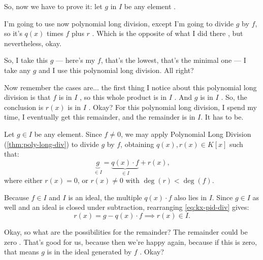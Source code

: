 \begin{proofWrapper}
\begin{speech}[00:34:07 - 00:35:15]
So, now we have to prove it: let $g$ in $I$ be any element .

I'm going to use now polynomial long division, except I'm going to divide $g$ by $f$, so it's $q(x)$ times $f$ plus $r$ . Which is the opposite of what I did there , but nevertheless, okay.

So, I take this $g$ --- here's my $f$, that's the lowest, that's the minimal one --- I take any $g$ and I use this polynomial long division. All right?

Now remember the cases are... the first thing I notice about this polynomial long division is that $f$ is in $I$ , so this whole product is in $I$ . And $g$ is in $I$ . So, the conclusion is $r(x)$ is in $I$ . Okay? For this polynomial long division, I spend my time, I eventually get this remainder, and the remainder is in $I$. It has to be.
\end{speech}

\begin{content}
Let $g \in I$ be any element. Since $f \neq 0$, we may apply Polynomial Long Division (\cref{thm:poly-long-div}) to divide $g$ by $f$, obtaining $q(x), r(x) \in K[x]$ such that:
\begin{equation}\label{eq:kx-pid-div}
\underbrace{g}_{\in I} = \underbrace{q(x) \cdot f}_{\in I} + r(x),
\end{equation}
where either $r(x) = 0$, or $r(x) \neq 0$ with $\deg(r) < \deg(f)$.

Because $f \in I$ and $I$ is an ideal, the multiple $q(x) \cdot f$ also lies in $I$. Since $g \in I$ as well and an ideal is closed under subtraction, rearranging \eqref{eq:kx-pid-div} gives:
\[
r(x) = g - q(x) \cdot f \implies r(x) \in I.
\]
\end{content}

\begin{speech}[00:35:16 - 00:36:27]
Okay, so what are the possibilities for the remainder? The remainder could be zero . That's good for us, because then we're happy again, because if this is zero, that means $g$ is in the ideal generated by $f$ . Okay?


\end{speech}
\end{proofWrapper}
